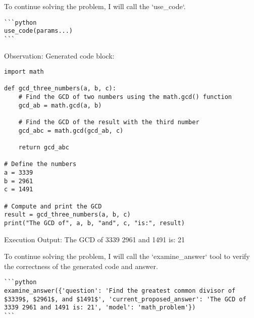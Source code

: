 \begin{tcolorbox}[colback=green!5, colframe=black, arc=2pt, boxrule=0.5pt, breakable]
To continue solving the problem, I will call the `use\_code`.\\

\begin{lstlisting}[style=pythonstyle]
```python
use_code(params...)
```
\end{lstlisting}
\end{tcolorbox}

\begin{tcolorbox}[colback=lightblue, colframe=black, arc=2pt, breakable, title=Use Code Tool]
Observation:
Generated code block: 
\begin{lstlisting}[style=pythonstyle]
import math

def gcd_three_numbers(a, b, c):
    # Find the GCD of two numbers using the math.gcd() function
    gcd_ab = math.gcd(a, b)
    
    # Find the GCD of the result with the third number
    gcd_abc = math.gcd(gcd_ab, c)
    
    return gcd_abc

# Define the numbers
a = 3339
b = 2961
c = 1491

# Compute and print the GCD
result = gcd_three_numbers(a, b, c)
print("The GCD of", a, b, "and", c, "is:", result)
\end{lstlisting}

Execution Output:
The GCD of 3339 2961 and 1491 is: 21
\end{tcolorbox}


\begin{tcolorbox}[colback=green!5, colframe=black, arc=2pt, boxrule=0.5pt, breakable]
To continue solving the problem, I will call the `examine\_answer` tool to verify the correctness of the generated code and answer.\\

\begin{lstlisting}[style=pythonstyle]
```python
examine_answer({'question': 'Find the greatest common divisor of $3339$, $2961$, and $1491$', 'current_proposed_answer': 'The GCD of 3339 2961 and 1491 is: 21', 'model': 'math_problem'})
```
\end{lstlisting}
\end{tcolorbox}


